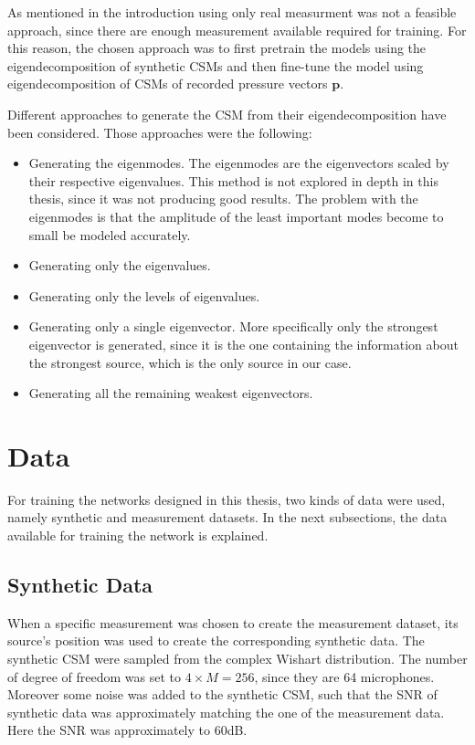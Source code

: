\documentclass[11pt,a4paper,twoside]{report}
\begin{document}
As mentioned in the introduction using only real measurment was not a feasible approach, since there are enough measurement available required for training. For this reason, the chosen approach was to first pretrain the models using the eigendecomposition of synthetic CSMs and then fine-tune the model using eigendecomposition of CSMs of recorded pressure vectors $\mathbf{p}$. 

Different approaches to generate the CSM from their eigendecomposition have been considered. Those approaches were the following:

\begin{itemize}
    \item Generating the eigenmodes. The eigenmodes are the eigenvectors scaled by their respective eigenvalues. This method is not explored in depth in this thesis, since it was not producing good results. The problem with the eigenmodes is that the amplitude of the least important modes become to small be modeled accurately. 
    \item Generating only the eigenvalues.
    \item Generating only the levels of eigenvalues.
    \item Generating only a single eigenvector. More specifically only the strongest eigenvector is generated, since it is the one containing the information about the strongest source, which is the only source in our case. 
    \item Generating all the remaining weakest eigenvectors.
\end{itemize}

\section{Data}

For training the networks designed in this thesis, two kinds of data were used, namely synthetic and measurement datasets. In the next subsections, the data available for training the network is explained. 

\subsection{Synthetic Data}

When a specific measurement was chosen to create the measurement dataset, its source's position was used to create the corresponding synthetic data. The synthetic CSM were sampled from the complex Wishart distribution. The number of degree of freedom was set to $4 \times M = 256$, since they are 64 microphones. Moreover some noise was added to the synthetic CSM, such that the SNR of synthetic data was approximately matching the one of the measurement data. Here the SNR was approximately to 60dB. 
\end{document}
